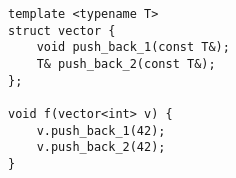 \begin{lstlisting}[title=\href{https://godbolt.org/z/9def7a}{\texttt{godbolt.org/z/9def7a}}]
template <typename T>
struct vector {
    void push_back_1(const T&);
    T& push_back_2(const T&);
};

void f(vector<int> v) {
    v.push_back_1(42);
    v.push_back_2(42);
}
\end{lstlisting}

